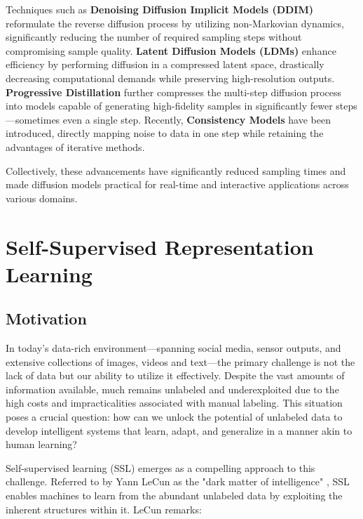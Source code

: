Techniques such as \textbf{Denoising Diffusion Implicit Models (DDIM)} \cite{song2020denoising} reformulate the reverse diffusion process by utilizing non-Markovian dynamics, significantly reducing the number of required sampling steps without compromising sample quality. \textbf{Latent Diffusion Models (LDMs)} \cite{rombach2022high} enhance efficiency by performing diffusion in a compressed latent space, drastically decreasing computational demands while preserving high-resolution outputs. \textbf{Progressive Distillation} \cite{salimans2022progressive} further compresses the multi-step diffusion process into models capable of generating high-fidelity samples in significantly fewer steps—sometimes even a single step. Recently, \textbf{Consistency Models} \cite{song2023consistency} have been introduced, directly mapping noise to data in one step while retaining the advantages of iterative methods.

Collectively, these advancements have significantly reduced sampling times and made diffusion models practical for real-time and interactive applications across various domains.

\section{Self-Supervised Representation Learning}

\subsection{Motivation}


In today's data-rich environment—spanning social media, sensor outputs, and extensive collections of images, videos and text—the primary challenge is not the lack of data but our ability to utilize it effectively. Despite the vast amounts of information available, much remains unlabeled and underexploited due to the high costs and impracticalities associated with manual labeling. This situation poses a crucial question: how can we unlock the potential of unlabeled data to develop intelligent systems that learn, adapt, and generalize in a manner akin to human learning?

Self-supervised learning (SSL) emerges as a compelling approach to this challenge. Referred to by Yann LeCun as the "dark matter of intelligence" \citep{lecun2021self}, SSL enables machines to learn from the abundant unlabeled data by exploiting the inherent structures within it. LeCun remarks:

